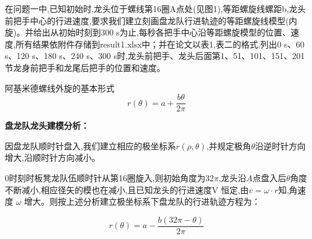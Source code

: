 














在问题一中,已知初始时,龙头位于螺线第16圈A点处(见图1),等距螺旋线螺距b,龙头前把手中心的行进速度,要求我们建立刻画盘龙队行进轨迹的等距螺旋线模型(内旋)。并给出从初始时刻到300 s为止,每秒各把手中心沿等距螺旋模型的位置、速度,所有结果依附件存储到result1.xlsx中；并在论文以表1,表二的格式,列出0 s、60 s、120 s、180 s、240 s、300 s时,龙头前把手、龙头后面第1、51、101、151、201节龙身前把手和龙尾后把手的位置和速度。


阿基米德螺线外旋的基本形式
\begin{equation}
	r(\theta)=  a + \frac{b\theta}{2\pi}
\end{equation}

\textbf{盘龙队龙头建模分析：}

因盘龙队顺时针盘入,我们建立相应的极坐标系$r(\rho,\theta)$,并规定极角$\theta$沿逆时针方向增大,沿顺时针方向减小。


$0$时刻时板凳龙队伍顺时针从第16圈旋入,则初始角度为32$\pi$,龙头沿$A$点盘入后$\theta$角度不断减小,相应径矢的模也在减小,且已知龙头的行进速度V 恒定,由$v = \omega \cdot r $知,角速度 $\omega$ 增大。则按上述分析建立极坐标系下盘龙队的行进轨迹方程为：

\begin{equation}
	r(\theta) = a - \frac{b(32\pi - \theta)}{2\pi}
\end{equation}

